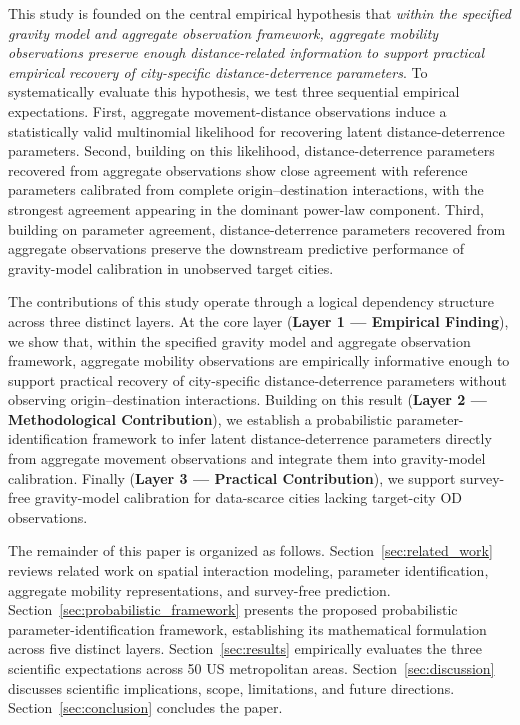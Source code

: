 \documentclass[pdflatex,sn-basic,iicol]{sn-jnl}
\begin{document}
This study is founded on the central empirical hypothesis that \emph{within the specified gravity model and aggregate observation framework, aggregate mobility observations preserve enough distance-related information to support practical empirical recovery of city-specific distance-deterrence parameters}. To systematically evaluate this hypothesis, we test three sequential empirical expectations. First, aggregate movement-distance observations induce a statistically valid multinomial likelihood for recovering latent distance-deterrence parameters. Second, building on this likelihood, distance-deterrence parameters recovered from aggregate observations show close agreement with reference parameters calibrated from complete origin--destination interactions, with the strongest agreement appearing in the dominant power-law component. Third, building on parameter agreement, distance-deterrence parameters recovered from aggregate observations preserve the downstream predictive performance of gravity-model calibration in unobserved target cities.

The contributions of this study operate through a logical dependency structure across three distinct layers. At the core layer (\textbf{Layer 1 — Empirical Finding}), we show that, within the specified gravity model and aggregate observation framework, aggregate mobility observations are empirically informative enough to support practical recovery of city-specific distance-deterrence parameters without observing origin--destination interactions. Building on this result (\textbf{Layer 2 — Methodological Contribution}), we establish a probabilistic parameter-identification framework to infer latent distance-deterrence parameters directly from aggregate movement observations and integrate them into gravity-model calibration. Finally (\textbf{Layer 3 — Practical Contribution}), we support survey-free gravity-model calibration for data-scarce cities lacking target-city OD observations.

The remainder of this paper is organized as follows. Section~\ref{sec:related_work} reviews related work on spatial interaction modeling, parameter identification, aggregate mobility representations, and survey-free prediction. Section~\ref{sec:probabilistic_framework} presents the proposed probabilistic parameter-identification framework, establishing its mathematical formulation across five distinct layers. Section~\ref{sec:results} empirically evaluates the three scientific expectations across 50 US metropolitan areas. Section~\ref{sec:discussion} discusses scientific implications, scope, limitations, and future directions. Section~\ref{sec:conclusion} concludes the paper.
\end{document}
